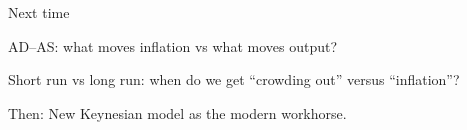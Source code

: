 \documentclass[aspectratio=169,xcolor=dvipsnames]{beamer}
\let\tempone\itemize
\let\temptwo\enditemize
\renewenvironment{itemize}{\tempone\addtolength{\itemsep}{\fill}}{\temptwo}
\begin{document}
\begin{frame}{Next time}
\large
\begin{itemize}
\item AD--AS: what moves inflation vs what moves output?
\item Short run vs long run: when do we get “crowding out” versus “inflation”?
\item Then: New Keynesian model as the modern workhorse.
\end{itemize}
\end{frame}
\end{document}
